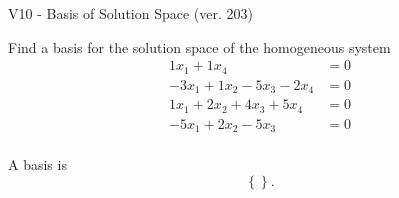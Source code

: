 \begin{exercise}
  \begin{exerciseTitle}V10 - Basis of Solution Space (ver. 203)\end{exerciseTitle}
  \begin{exerciseStatement}
    Find a basis for the solution space of the homogeneous system 
\begin{align*}
 1 x_ 1 + 1 x_ 4 &= 0  \\ 
  -3 x_ 1 + 1 x_ 2 -5 x_ 3 -2 x_ 4 &= 0  \\ 
  1 x_ 1 + 2 x_ 2 + 4 x_ 3 + 5 x_ 4 &= 0  \\ 
  -5 x_ 1 + 2 x_ 2 -5 x_ 3 &= 0  \\ 
 \end{align*}


 
  \end{exerciseStatement}

  \begin{exerciseAnswer}
   A basis is   
\[\left\{\right\}.\]

  


  \end{exerciseAnswer}
\end{exercise}